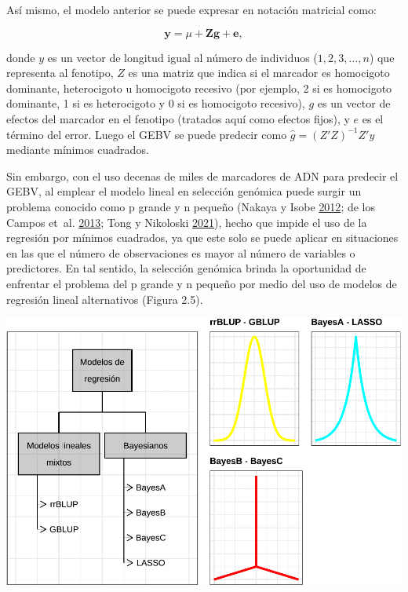 \documentclass[11pt,spanish,a4paper,oneside,]{book} %
\begin{document}
Así mismo, el modelo anterior se puede expresar en notación matricial como:

\begin{equation}
\textbf{y} = \mu + \textbf{Z} \textbf{g} + \textbf{e},
\end{equation}

donde \(y\) es un vector de longitud igual al número de individuos (\(1, 2, 3, …, n\)) que representa al fenotipo, \(Z\) es una matriz que indica si el marcador es homocigoto dominante, heterocigoto u homocigoto recesivo (por ejemplo, 2 si es homocigoto dominante, 1 si es heterocigoto y 0 si es homocigoto recesivo), \(g\) es un vector de efectos del marcador en el fenotipo (tratados aquí como efectos fijos), y \(e\) es el término del error. Luego el GEBV se puede predecir como \(\hat{g} = (Z'Z)^{- 1} Z'y\) mediante mínimos cuadrados.

Sin embargo, con el uso decenas de miles de marcadores de ADN para predecir el GEBV, al emplear el modelo lineal en selección genómica puede surgir un problema conocido como p grande y n pequeño (Nakaya y Isobe \protect\hyperlink{ref-cite:6}{2012}; de los Campos et~al. \protect\hyperlink{ref-cite:31}{2013}; Tong y Nikoloski \protect\hyperlink{ref-cite:7}{2021}), hecho que impide el uso de la regresión por mínimos cuadrados, ya que este solo se puede aplicar en situaciones en las que el número de observaciones es mayor al número de variables o predictores. En tal sentido, la selección genómica brinda la oportunidad de enfrentar el problema del p grande y n pequeño por medio del uso de modelos de regresión lineal alternativos (Figura 2.5).

\begin{center}\includegraphics[width=1\linewidth]{figures/Mod_GS} \end{center}
\end{document}
